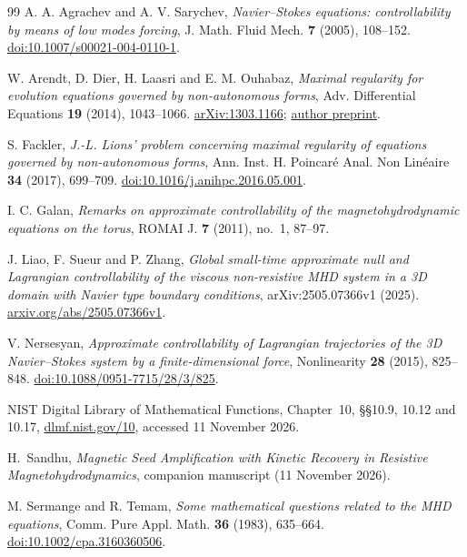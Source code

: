 \documentclass[11pt,a4paper]{amsart}
\theoremstyle{definition}
\theoremstyle{remark}
\numberwithin{equation}{section}
\begin{document}
\begin{thebibliography}{99}
A. A. Agrachev and A. V. Sarychev,
\emph{Navier--Stokes equations: controllability by means of low modes forcing},
J. Math. Fluid Mech. \textbf{7} (2005), 108--152.
\href{https://doi.org/10.1007/s00021-004-0110-1}{doi:10.1007/s00021-004-0110-1}.

W. Arendt, D. Dier, H. Laasri and E. M. Ouhabaz,
\emph{Maximal regularity for evolution equations governed by non-autonomous forms},
Adv. Differential Equations \textbf{19} (2014), 1043--1066.
\href{https://arxiv.org/abs/1303.1166}{arXiv:1303.1166};
\href{https://www.uni-ulm.de/fileadmin/website_uni_ulm/mawi.inst.020/arendt/downloads/publications/preprints/ADLO5-11.pdf}{author preprint}.

S. Fackler,
\emph{J.-L. Lions' problem concerning maximal regularity of equations governed by non-autonomous forms},
Ann. Inst. H. Poincar\'e Anal. Non Lin\'eaire \textbf{34} (2017), 699--709.
\href{https://doi.org/10.1016/j.anihpc.2016.05.001}{doi:10.1016/j.anihpc.2016.05.001}.

I. C. Galan,
\emph{Remarks on approximate controllability of the magnetohydrodynamic equations on the torus},
ROMAI J. \textbf{7} (2011), no.~1, 87--97.

J. Liao, F. Sueur and P. Zhang,
\emph{Global small-time approximate null and Lagrangian controllability of the viscous non-resistive MHD system in a 3D domain with Navier type boundary conditions},
arXiv:2505.07366v1 (2025).
\href{https://arxiv.org/abs/2505.07366v1}{arxiv.org/abs/2505.07366v1}.

V. Nersesyan,
\emph{Approximate controllability of Lagrangian trajectories of the 3D Navier--Stokes system by a finite-dimensional force},
Nonlinearity \textbf{28} (2015), 825--848.
\href{https://doi.org/10.1088/0951-7715/28/3/825}{doi:10.1088/0951-7715/28/3/825}.

NIST Digital Library of Mathematical Functions,
Chapter~10, \S\S10.9, 10.12 and 10.17,
\href{https://dlmf.nist.gov/10}{dlmf.nist.gov/10}, accessed 11 November 2026.

H.~Sandhu,
\emph{Magnetic Seed Amplification with Kinetic Recovery in Resistive Magnetohydrodynamics},
companion manuscript (11 November 2026).

M. Sermange and R. Temam,
\emph{Some mathematical questions related to the MHD equations},
Comm. Pure Appl. Math. \textbf{36} (1983), 635--664.
\href{https://doi.org/10.1002/cpa.3160360506}{doi:10.1002/cpa.3160360506}.


\end{thebibliography}
\end{document}
